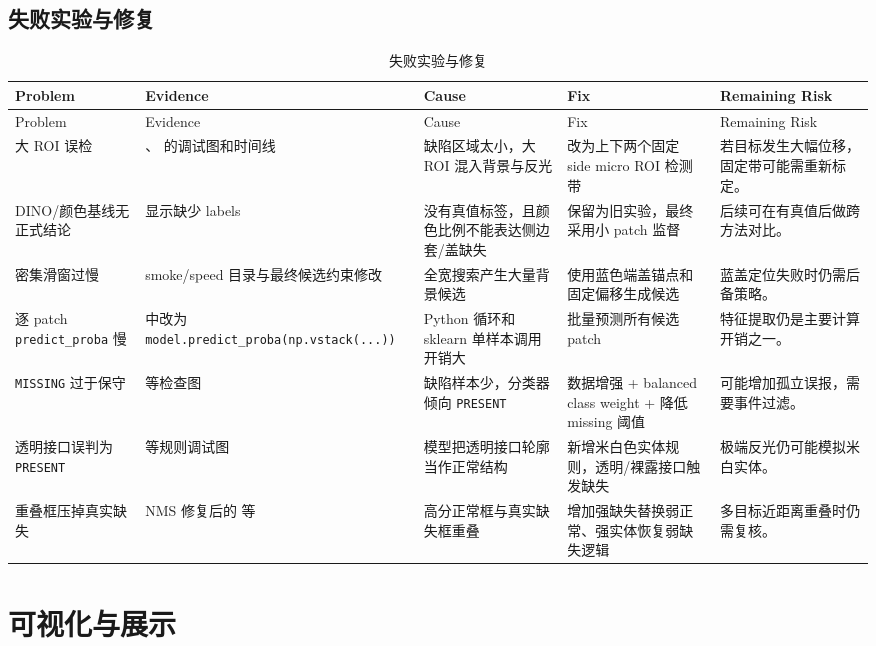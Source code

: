 \documentclass[a4paper,12pt]{article}
\newcommand{\code}[1]{\texttt{#1}}
\begin{document}
\subsection{失败实验与修复}
\begin{longtable}{L{0.18\textwidth}L{0.20\textwidth}L{0.20\textwidth}L{0.20\textwidth}L{0.14\textwidth}}
\caption{失败实验与修复}
\label{tab:failure-fix}\\
\toprule
Problem & Evidence & Cause & Fix & Remaining Risk \\
\midrule
\endfirsthead
\toprule
Problem & Evidence & Cause & Fix & Remaining Risk \\
\midrule
\endhead
大 ROI 误检 & 、 的调试图和时间线 & 缺陷区域太小，大 ROI 混入背景与反光 & 改为上下两个固定 side micro ROI 检测带 & 若目标发生大幅位移，固定带可能需重新标定。 \\
DINO/颜色基线无正式结论 &  显示缺少 labels & 没有真值标签，且颜色比例不能表达侧边套/盖缺失 & 保留为旧实验，最终采用小 patch 监督 & 后续可在有真值后做跨方法对比。 \\
密集滑窗过慢 & smoke/speed 目录与最终候选约束修改 & 全宽搜索产生大量背景候选 & 使用蓝色端盖锚点和固定偏移生成候选 & 蓝盖定位失败时仍需后备策略。 \\
逐 patch \code{predict\_proba} 慢 &  中改为 \code{model.predict\_proba(np.vstack(...))} & Python 循环和 sklearn 单样本调用开销大 & 批量预测所有候选 patch & 特征提取仍是主要计算开销之一。 \\
\code{MISSING} 过于保守 &  等检查图 & 缺陷样本少，分类器倾向 \code{PRESENT} & 数据增强 + balanced class weight + 降低 missing 阈值 & 可能增加孤立误报，需要事件过滤。 \\
透明接口误判为 \code{PRESENT} &  等规则调试图 & 模型把透明接口轮廓当作正常结构 & 新增米白色实体规则，透明/裸露接口触发缺失 & 极端反光仍可能模拟米白实体。 \\
重叠框压掉真实缺失 & NMS 修复后的  等 & 高分正常框与真实缺失框重叠 & 增加强缺失替换弱正常、强实体恢复弱缺失逻辑 & 多目标近距离重叠时仍需复核。 \\
\bottomrule
\end{longtable}

\section{可视化与展示}
\end{document}
